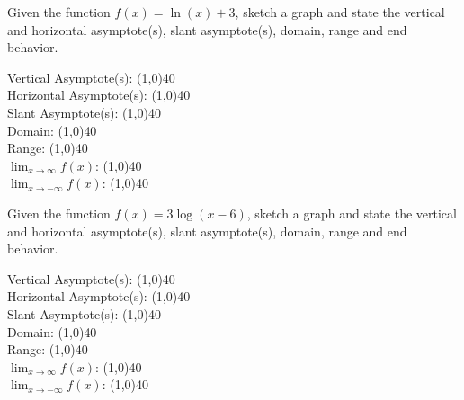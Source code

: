 \documentclass[../main.tex]{subfiles}
\begin{document}
\begin{questions}
    \newpage
    \question[1] Given the function $f(x) = \ln(x) + 3$, sketch a graph and state the vertical and horizontal asymptote(s), slant asymptote(s), domain, range and end behavior.
    
        \begin{left} 
        \end{left}
    
    Vertical Asymptote(s): \line(1,0){40} \\
    \newline
    Horizontal Asymptote(s): \line(1,0){40} \\
    \newline
    Slant Asymptote(s): \line(1,0){40} \\
    \newline
    Domain: \line(1,0){40} \\
    \newline
    Range: \line(1,0){40} \\
    \newline
    $\lim_{x\to\infty} f(x)$: \line(1,0){40} \\
    \newline
    $\lim_{x\to-\infty} f(x)$: \line(1,0){40} \\
    
    \question[1] Given the function $f(x) = 3\log(x-6)$, sketch a graph and state the vertical and horizontal asymptote(s), slant asymptote(s), domain, range and end behavior.
    
        \begin{left} 
        \end{left}
    
    Vertical Asymptote(s): \line(1,0){40} \\
    \newline
    Horizontal Asymptote(s): \line(1,0){40} \\
    \newline
    Slant Asymptote(s): \line(1,0){40} \\
    \newline
    Domain: \line(1,0){40} \\
    \newline
    Range: \line(1,0){40} \\
    \newline
    $\lim_{x\to\infty} f(x)$: \line(1,0){40} \\
    \newline
    $\lim_{x\to-\infty} f(x)$: \line(1,0){40} \\
    

\end{questions}
\end{document}
